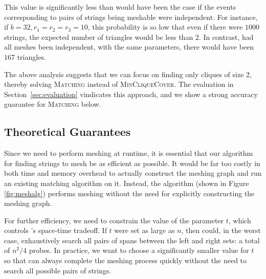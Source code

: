 This value is significantly less than would have been the case if the
events corresponding to pairs of strings being meshable were
independent.
For instance, if $b = 32, r_1=r_2=r_3 = 10$, this probability is so
low that even if there were $1000$ strings, the expected number of
triangles would be less than 2. In contrast, had all meshes been
independent, with the same parameters, there would have been $167$ triangles.

The above analysis suggests that we can focus on finding only cliques
of size 2, thereby solving \textsc{Matching} instead of
\textsc{MinCliqueCover}. The evaluation in
Section~\ref{sec:evaluation} vindicates this approach, and we show a
strong accuracy guarantee for \textsc{Matching} below.

\subsection{Theoretical Guarantees}
\label{subsec:analysis}
Since we need to perform meshing at runtime, it is essential that our
algorithm for finding strings to mesh be as efficient as possible. It
would be far too costly in both time and memory overhead to actually
construct the meshing graph and run an existing matching algorithm on
it. Instead, the \sm algorithm (shown in Figure \ref{fig:meshalg})
performs meshing without the need for explicitly constructing the
meshing graph.

For further efficiency, we need to constrain the value of the
parameter $t$, which controls \Mesh{}'s space-time tradeoff. If $t$
were set as large as $n$, then \sm could, in the worst case,
exhaustively search all pairs of spans between the left and right
sets: a total of $n^2/4$ probes.  In practice, we want to choose a
significantly smaller value for $t$ so that \Mesh{} can always
complete the meshing process quickly without the need to search all
possible pairs of strings.


